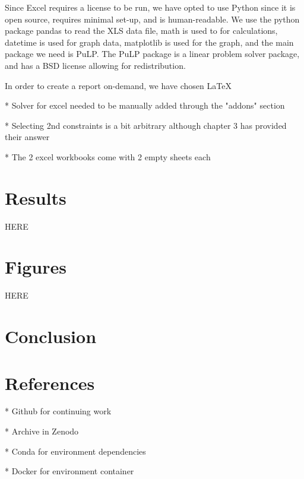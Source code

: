 \documentclass[acmtog]{acmart}
\begin{document}
Since Excel requires a license to be run, we have opted to use Python since it is open source, requires minimal set-up, and is human-readable. We use the python package pandas to read the XLS data file, math is used to for calculations, datetime is used for graph data, matplotlib is used for the graph, and the main package we need is PuLP. The PuLP package is a linear problem solver package, and has a BSD license allowing for redistribution. 

	In order to create a report on-demand, we have chosen \LaTeX\ 
	
* Solver for excel needed to be manually added through the "addons" section

* Selecting 2nd constraints is a bit arbitrary although chapter 3 has provided their answer

* The 2 excel workbooks come with 2 empty sheets each

\section{Results}
HERE

\section{Figures}
HERE

\section{Conclusion}

\section{References}
* Github for continuing work

* Archive in Zenodo

* Conda for environment dependencies

* Docker for environment container
\end{document}

